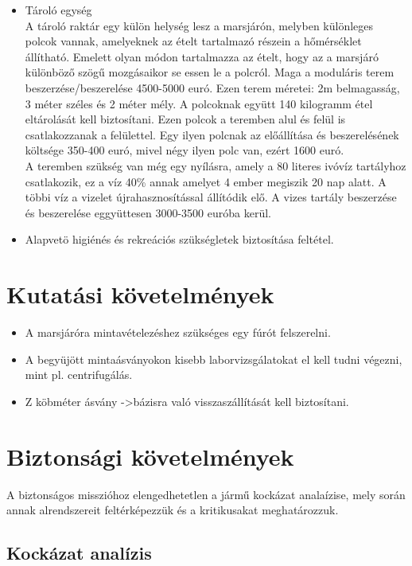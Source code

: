 \documentclass[12pt]{report}
\begin{document}
\begin{itemize}
\begin{itemize}
    \item Tároló egység \\
    A tároló raktár egy külön helység lesz a marsjárón, melyben különleges polcok vannak, amelyeknek az ételt tartalmazó részein a hőmérséklet állítható. Emelett olyan módon tartalmazza az ételt, hogy az a marsjáró különböző szögű mozgásaikor se essen le a polcról. Maga a moduláris terem beszerzése/beszerelése 4500-5000 euró. Ezen terem méretei: 2m belmagasság, 3 méter széles és 2 méter mély. A polcoknak együtt 140 kilogramm étel eltárolását kell biztosítani. Ezen polcok a teremben alul és felül is csatlakozzanak a felülettel. Egy ilyen polcnak az előállítása és beszerelésének költsége 350-400 euró, mivel négy ilyen polc van, ezért 1600 euró. \\
    A teremben szükség van még egy nyílásra, amely a 80 literes ivóvíz tartályhoz csatlakozik, ez a víz 40\% annak amelyet 4 ember megiszik 20 nap alatt. A többi víz a vizelet újrahasznosítással állítódik elő. A vizes tartály beszerzése és beszerelése eggyüttesen 3000-3500 euróba kerül.  
    
  \item Alapvetö higiénés és rekreációs szükségletek biztosítása feltétel.
\end{itemize}
\section{Kutatási követelmények}
\begin{itemize}
  \item A marsjáróra mintavételezéshez szükséges egy fúrót felszerelni.
  \item A begyüjött mintaásványokon kisebb laborvizsgálatokat el kell tudni végezni, mint pl. centrifugálás.
  \item Z köbméter ásvány ->bázisra való visszaszállítását kell biztosítani.
\end{itemize}
\section{Biztonsági követelmények}

A biztonságos misszióhoz elengedhetetlen a jármű kockázat analaízise, mely során annak alrendszereit feltérképezzük és a kritikusakat meghatározzuk. 

\subsection{Kockázat analízis}




\end{itemize}
\end{document}
